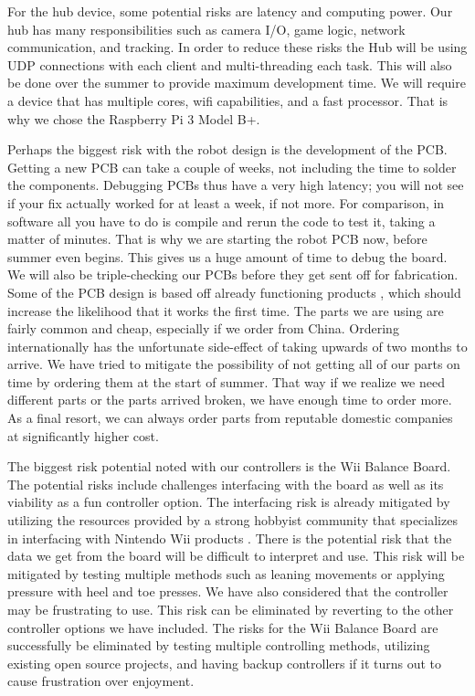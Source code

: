 \documentclass[11pt]{ieeeconf}
\begin{document}
For the hub device, some potential risks are latency and computing power. Our hub has many responsibilities such as camera I/O, game logic,  network communication, and tracking. In order to reduce these risks the Hub will be using UDP connections with each client and multi-threading each task. This will also be done over the summer to provide maximum development time. We will require a device that has multiple cores, wifi capabilities, and a fast processor. That is why we chose the Raspberry Pi 3 Model B+.

Perhaps the biggest risk with the robot design is the development of the PCB. Getting a new PCB can take a couple of weeks, not including the time to solder the components. Debugging PCBs thus have a very high latency; you will not see if your fix actually worked for at least a week, if not more. For comparison, in software all you have to do is compile and rerun the code to test it, taking a matter of minutes. That is why we are starting the robot PCB now, before summer even begins. This gives us a huge amount of time to debug the board. We will also be triple-checking our PCBs before they get sent off for fabrication. Some of the PCB design is based off already functioning products \cite{feather}, which should increase the likelihood that it works the first time. The parts we are using are fairly common and cheap, especially if we order from China. Ordering internationally has the unfortunate side-effect of taking upwards of two months to arrive. We have tried to mitigate the possibility of not getting all of our parts on time by ordering them at the start of summer. That way if we realize we need different parts or the parts arrived broken, we have enough time to order more. As a final resort, we can always order parts from reputable domestic companies at significantly higher cost.

The biggest risk potential noted with our controllers is the Wii Balance Board. The potential risks include challenges interfacing with the board as well as its viability as a fun controller option. The interfacing risk is already mitigated by utilizing the resources provided by a strong hobbyist community that specializes in interfacing with Nintendo Wii products \cite{homebrew}. There is the potential risk that the data we get from the board will be difficult to interpret and use. This risk will be mitigated by testing multiple methods such as leaning movements or applying pressure with heel and toe presses. We have also considered that the controller may be frustrating to use. This risk can be eliminated by reverting to the other controller options we have included. The risks for the Wii Balance Board are successfully be eliminated by testing multiple controlling methods, utilizing existing open source projects, and having backup controllers if it turns out to cause frustration over enjoyment.
\end{document}

